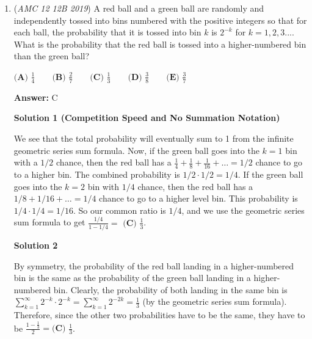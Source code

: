 \begin{enumerate}
 



\textbf{Solution 3 (easier finish to Solution 1)}

Again, use Pythagorean Theorem to find that $AD=\frac{3}{2}$ and $CD=\frac{1}{2}$. Let $\angle DAC=\theta$. Note that we want 
 \[\sin{(90+2\theta)}=\cos{2\theta}\]which is easy to compute 
 \[\cos{\theta}=\frac{2\sqrt{2}}{3}\implies \cos{2\theta}=2(\frac{8}{9})-1= \boxed{\textbf{(D) } \frac{7}{9}}\]

 \textbf{Also See} 


	\item (\textit{AMC 12 12B 2019}) A red ball and a green ball are randomly and independently tossed into bins numbered with the positive integers so that for each ball, the probability that it is tossed into bin $k$ is $2^{-k}$ for $k = 1,2,3....$  What is the probability that the red ball is tossed into a higher-numbered bin than the green ball?



 $\textbf{(A) } \frac{1}{4} \qquad\textbf{(B) } \frac{2}{7} \qquad\textbf{(C) } \frac{1}{3} \qquad\textbf{(D) } \frac{3}{8} \qquad\textbf{(E) } \frac{3}{7}$

 \textbf{Answer: }C



\textbf{Solution 1 (Competition Speed and No Summation Notation)}

We see that the total probability will eventually sum to 1 from the infinite geometric series sum formula. Now, if the green ball goes into the \( k=1 \) bin with a \( 1/2 \) chance, then the red ball has a \( \frac{1}{4} + \frac{1}{8} + \frac{1}{16} + \dots = 1/2 \) chance to go to a higher bin. The combined probability is \( 1/2 \cdot 1/2 = 1/4 \). If the green ball goes into the \( k=2 \) bin with \( 1/4 \) chance, then the red ball has a \( 1/8 + 1/16 + \dots = 1/4 \) chance to go to a higher level bin. This probability is \( 1/4 \cdot 1/4 = 1/16 \). So our common ratio is \( 1/4 \), and we use the geometric series sum formula to get \( \frac{1/4}{1 - 1/4} = \) $\boxed{\textbf{(C) } \frac{1}{3}}$.

 



\textbf{Solution 2}

By symmetry, the probability of the red ball landing in a higher-numbered bin is the same as the probability of the green ball landing in a higher-numbered bin. Clearly, the probability of both landing in the same bin is $\sum_{k=1}^{\infty}{2^{-k} \cdot 2^{-k}} = \sum_{k=1}^{\infty}2^{-2k} = \frac{1}{3}$ (by the geometric series sum formula). Therefore, since the other two probabilities have to be the same, they have to be $\frac{1-\frac{1}{3}}{2} = \boxed{\textbf{(C) } \frac{1}{3}}$.


\end{enumerate}

